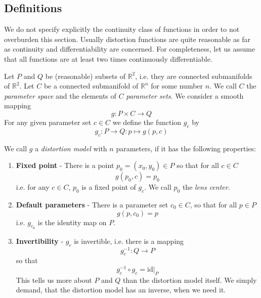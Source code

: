 \documentclass[10pt,a4paper]{article}
\newcommand{\Rpow}[1]{\mathbb{R}^{#1}}
\begin{document}
\subsection{Definitions}
We do not specify explicitly the continuity class of functions in order to not overburden this section.
Usually distortion functions are quite reasonable as far as continuity and differentiability are concerned. 
For completeness, let us assume that all functions are at least two times continuously differentiable.
\begin{defn}
\label{def:DistortionModel}
Let $P$ and $Q$ be (reasonable) subsets of $\Rpow{2}$, i.e. they are connected submanifolds of $\Rpow{2}$.
Let $C$ be a connected submanifold of $\Rpow{n}$ for some number $n$. We call $C$ the {\em parameter
space} and the elements of $C$ {\em parameter sets}.
We consider a smooth mapping
\begin{equation}
g : P \times C \rightarrow Q
\end{equation}
For any given parameter set $c\in C$ we define the function $g_c$ by
\begin{equation}
g_c:P\rightarrow Q:p\mapsto g(p,c)
\end{equation}

We call $g$ a {\em distortion model} with $n$ parameters, if it has the following properties:\newline
\begin{enumerate}
\item {\bf Fixed point} - There is a point $p_0 = (x_0,y_0)\in P$ so that for all $c\in C$
\begin{equation}
g(p_0,c) = p_0
\end{equation}
i.e. for any $c\in C$, $p_0$ is a fixed point of $g_c$. We call $p_0$ the {\em lens center}.\newline

\item{\bf Default parameters} - There is a parameter set $c_0\in C$, so that for all $p\in P$
\begin{equation}
g(p,c_0) = p
\end{equation}
i.e. $g_{c_0}$ is the identity map on $P$.

\item {\bf Invertibility} - $g_c$ is invertible, i.e. there is a mapping
\begin{equation}
g_c^{-1}: Q \rightarrow P
\end{equation}
so that
\begin{equation}
g_c^{-1}\circ g_c = \left.\mathrm{id}\right|_P
\end{equation}
This tells us more about $P$ and $Q$ than the distortion model itself.
We simply demand, that the distortion model has an inverse, when we need it.
\end{enumerate}
\end{defn}
\end{document}
